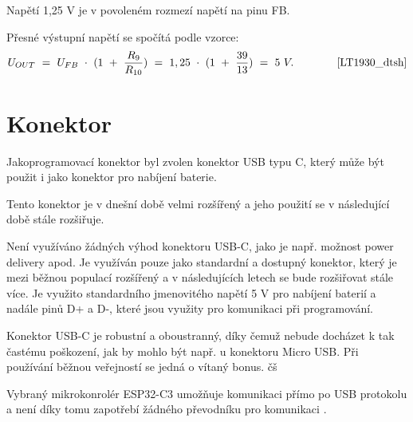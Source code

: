 Napětí 1,25 V je v povoleném rozmezí napětí na pinu FB. 

Přesné výstupní napětí se spočítá podle vzorce:
\begin{equation} 
  U_{OUT}~=~U_{FB}~\cdot~(1~+~\frac{R_{9}}{R_{10}})~=~1,25~\cdot~(1~+~\frac{39}{13})~=~5~V. 
  \quad \quad \quad \quad \cite{LT1930_dtsh}
\label{eq:VOUT_LT1930}
\end{equation}



\section{Konektor}
Jakoprogramovací konektor byl zvolen konektor USB typu C, který může být použit i jako konektor pro nabíjení baterie.

Tento konektor je v dnešní době velmi rozšířený a jeho použití se v následující době stále rozšiřuje. 

Není využíváno žádných výhod konektoru USB-C, jako je např. možnost power delivery apod. Je využíván pouze jako standardní a dostupný konektor, který je mezi běžnou
populací rozšířený a v následujících letech se bude rozšiřovat stále více. Je využito standardního jmenovitého napětí 5 V pro nabíjení baterií a nadále pinů D+ a D-, 
které jsou využity pro komunikaci při programování. 

Konektor USB-C je robustní a oboustranný, díky čemuž nebude docházet k tak častému poškození, jak by mohlo být např. u konektoru Micro USB. Při používání běžnou veřejností
se jedná o vítaný bonus. čš

Vybraný mikrokonrolér ESP32-C3 umožňuje komunikaci přímo po USB protokolu a není díky tomu zapotřebí žádného převodníku pro komunikaci \cite{ESP_C3_dtsh}. %






